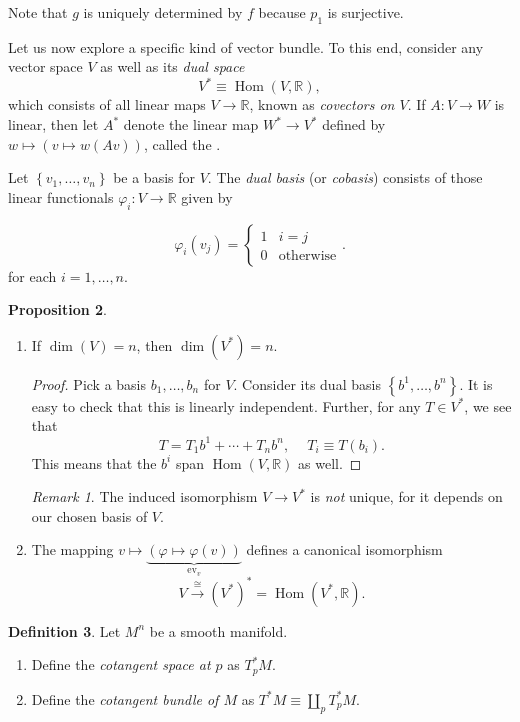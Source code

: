\documentclass[10pt,letterpaper,cm]{nupset}
\theoremstyle{definition}
\newtheorem{definition}{Definition}[subsection]
\theoremstyle{theorem}
\newtheorem{prop}[definition]{Proposition}
\theoremstyle{remark}
\newtheorem{remark}[definition]{Remark}
\newcommand{\R}{\mathbb R}
\newcommand{\1}{\mathbf{1}}
\newcommand{\0}{\vec 0}
\DeclareMathOperator{\Hom}{Hom}
\DeclareMathOperator{\ev}{ev}
\begin{document}
Note that $g$ is uniquely determined by $f$ because $p_1$ is surjective. 

\bigskip


Let us now explore a specific kind of vector bundle. To this end, consider any   vector space $V$ as well as its \textit{dual space} $$V^{\ast} \equiv \Hom(V, \R),$$ which consists of all linear maps  $V \to \R$, known as \textit{covectors on $V$}.
If $A : V \to W$ is linear, then let $A^{\ast}$ denote the linear map  $W^{\ast} \to V^{\ast}$ defined by $w \mapsto \left(v \mapsto w(Av)\right)$, called the .

\smallskip

Let $\left\{v_1, \ldots, v_n\right\}$ be a basis for $V$. The \textit{dual basis} (or \textit{cobasis}) consists of those linear functionals $\varphi_i : V \to \R$ given by 

\[ \varphi_i(v_j) =
\begin{cases}
1 & i = j
\\  0 & \text{otherwise}
\end{cases}.
\] for each $i=1, \ldots, n$.

\begin{prop} $ $ 
\begin{enumerate}[label=(\arabic*)]
\item If $\dim(V) =n$, then $\dim(V^{\ast}) = n$.
\begin{proof} 
 Pick a basis $b_1, \ldots, b_n$ for $V$. Consider its dual basis $\left\{b^1, \ldots, b^n\right\}$. It is easy to check that this is linearly independent. Further, for any $T\in V^{\ast}$, we see that 
\[
T = T_1b^1 + \cdots + T_nb^n, \ \quad T_i \equiv T(b_i).
\] This means that the $b^i$ span $\Hom(V, \R)$ as well.
\end{proof}
\begin{remark}
The induced isomorphism $V \to V^{\ast}$ is \emph{not} unique, for it depends on our chosen basis of $V$.
\end{remark}
\item The mapping $v \mapsto \underbrace{\left(\varphi \mapsto \varphi(v)\right)}_{\ev_v}$ defines a canonical isomorphism $$V \overset{\cong}{\longrightarrow} \left(V^{\ast}\right)^{\ast} = \Hom(V^{\ast}, \R).$$
\end{enumerate}
\end{prop}


\begin{definition} 
Let $M^n$ be a smooth manifold.
\begin{enumerate}
\item Define the \textit{cotangent space at $p$} as $T_p^{\ast}M$. 
\item Define the \textit{cotangent bundle of $M$} as $T^{\ast}M \equiv \coprod_p T_p^{\ast}M$.
\end{enumerate}
\end{definition}
\end{document}
